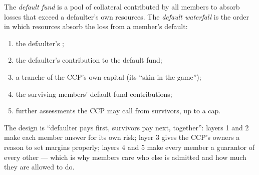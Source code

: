 \begin{definition}\label{def:m1:clearing-and-settlement:waterfall}
The \emph{default fund} is a pool of collateral
contributed by all members to absorb losses that exceed a defaulter's own
resources. The \emph{default waterfall} is the order
in which resources absorb the loss from a member's default:
\begin{enumerate}
\item the defaulter's ;
\item the defaulter's contribution to the default fund;
\item a tranche of the CCP's own capital (its ``skin in the game'');
\item the surviving members' default-fund contributions;
\item further assessments the CCP may call from survivors, up to a cap.
\end{enumerate}
\end{definition}

The design is ``defaulter pays first, survivors pay next, together'': layers
1 and 2 make each member answer for its own risk; layer 3 gives the CCP's
owners a reason to set margins properly; layers 4 and 5 make every member a
guarantor of every other --- which is why members care who else is admitted
and how much they are allowed to do.

